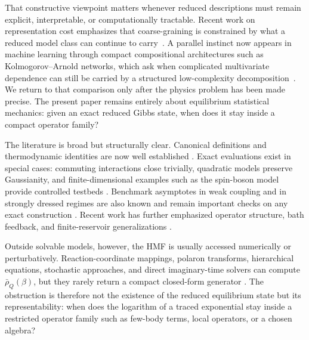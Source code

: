 That constructive viewpoint matters whenever reduced descriptions must remain
explicit, interpretable, or computationally tractable. Recent work on
representation cost emphasizes that coarse-graining is constrained by what a
reduced model class can continue to carry~\cite{mccaulCostComplexity2026}. A
parallel instinct now appears in machine learning through compact
compositional architectures such as Kolmogorov--Arnold networks, which ask
when complicated multivariate dependence can still be carried by a structured
low-complexity decomposition~\cite{liuKANKolmogorovArnoldNetworks2024}. We
return to that comparison only after the physics problem has been made
precise. The present paper remains entirely about equilibrium statistical
mechanics: given an exact reduced Gibbs state, when does it stay inside a
compact operator family?

The literature is broad but structurally clear. Canonical definitions and
thermodynamic identities are now well established
\cite{campisiFluctuationTheoremArbitrary2009,jarzynskiNonequilibriumWorkTheorem2004,seifertFirstSecondLaw2016,talknerColloquiumStatisticalMechanics2020,trushechkinOpenQuantumSystem2022}.
Exact evaluations exist in special cases: commuting interactions close
trivially, quadratic models preserve Gaussianity, and finite-dimensional
examples such as the spin-boson model provide controlled testbeds
\cite{campisiTalknerHanggi2009Solvable,caldeiraQuantumTunnellingDissipative1983a,grabertQuantumBrownianMotion1988,hiltHamiltonianMeanForce2011,leggettDynamicsDissipativeTwostate1987}.
Benchmark asymptotes in weak coupling and in strongly dressed regimes are also
known and remain important checks on any exact construction
\cite{cresserWeakUltrastrongCoupling2021a,hovhannisyanHamiltonianMeanForce2020}.
Recent work has further emphasized operator structure, bath feedback, and
finite-reservoir generalizations
\cite{burkeStructureHamiltonianMean2024,correaPotentialRenormalisationLamb2025,duGeneralizedHamiltonianMeanforce2025a}.

Outside solvable models, however, the HMF is usually accessed numerically or
perturbatively. Reaction-coordinate mappings, polaron transforms, hierarchical
equations, stochastic approaches, and direct imaginary-time solvers can compute
$\bar\rho_Q(\beta)$, but they rarely return a compact closed-form generator
\cite{nazirReactionCoordinateMapping2018,IlesSmithDijkstraLambertNazir2016,AntoSztrikacsNazirSegal2023,ShubrookIlesSmithNazir2025,moixEquilibriumreducedDensityMatrix2012,chenRigorousStochasticMatrix2014,makriExploitingClassicalDecoherence2014,tanimuraReducedHierarchicalEquations2014,songCalculationCorrelatedInitial2015,XuVadimovStockburgerAnkerhold2026,stockburgerSimulatingSpinbosonDynamics2004,mccaulPartitionfreeApproachOpen2017c}.
The obstruction is therefore not the existence of the reduced equilibrium state
but its representability: when does the logarithm of a traced exponential stay
inside a restricted operator family such as few-body terms, local operators, or
a chosen algebra?


